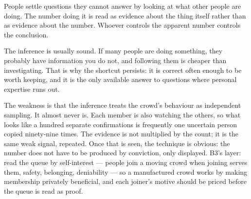 


\begin{core}
People settle questions they cannot answer by looking at what other people are doing. The number doing it is read as evidence about the thing itself rather than as evidence about the number. Whoever controls the apparent number controls the conclusion.
\end{core}

\begin{mechanism}
The inference is usually sound. If many people are doing something, they probably have information you do not, and following them is cheaper than investigating. That is why the shortcut persists: it is correct often enough to be worth keeping, and it is the only available answer to questions where personal expertise runs out.

The weakness is that the inference treats the crowd's behaviour as independent sampling. It almost never is. Each member is also watching the others, so what looks like a hundred separate confirmations is frequently one uncertain person copied ninety-nine times. The evidence is not multiplied by the count; it is the same weak signal, repeated. Once that is seen, the technique is obvious: the number does not have to be produced by conviction, only displayed. B3's layer: read the queue by self-interest --- people join a moving crowd when joining serves them, safety, belonging, deniability --- so a manufactured crowd works by making membership privately beneficial, and each joiner's motive should be priced before the queue is read as proof.
\end{mechanism}

